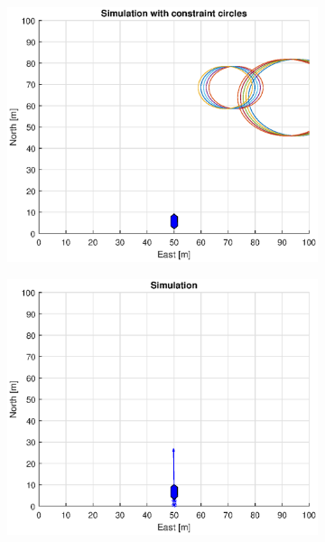 \begin{figure}[!b]
\begin{subfigure}[b]{0.499\textwidth}
    \end{subfigure}
    \hfill
    \\
    \begin{subfigure}[b]{0.49\textwidth}
        \centering
        \includegraphics[width=\textwidth]{Images/Figures/Enkel_GW/Simple0_f1_Frame2}
    \end{subfigure}
    \hfill
    \begin{subfigure}[b]{0.499\textwidth}
        \centering
        \includegraphics[width=\textwidth]{Images/Figures/Enkel_GW/Simple0_f600_Frame2}

\end{subfigure}
\end{figure}
